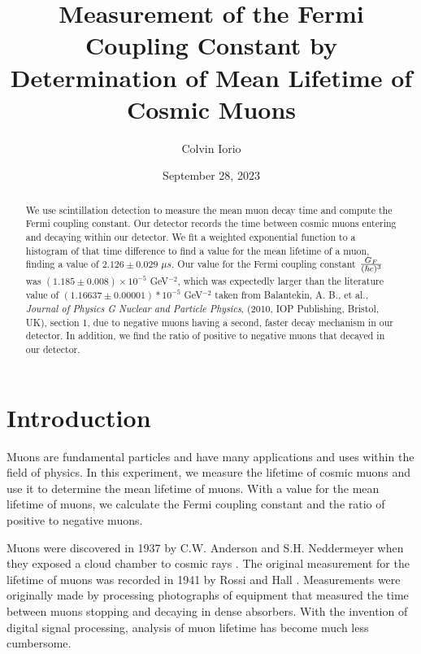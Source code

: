 \documentclass[11pt,letterpaper]{article}
\begin{document}
\title{Measurement of the Fermi Coupling Constant by Determination of Mean Lifetime of Cosmic Muons}

\author{Colvin Iorio}

\date{September 28, 2023}
\maketitle


\begin{abstract}
    We use scintillation detection to measure the mean muon decay time and compute the Fermi coupling constant. Our detector records the time between cosmic muons entering and decaying within our detector. We fit a weighted exponential function to a histogram of that time difference to find a value for the mean lifetime of a muon, finding a value of $2.126 \pm 0.029$ $\mu s$. Our value for the Fermi coupling constant ${G_F \over (\hbar c)^3}$ was $(1.185 \pm 0.008) \times 10^{-5}$ GeV$^{-2}$, which was expectedly larger than the literature value of $(1.16637 \pm 0.00001)*10^{-5}$ GeV$^{-2}$ taken from Balantekin, A. B., et al., \textit{Journal of Physics G Nuclear and Particle Physics}, (2010, IOP Publishing, Bristol, UK), section 1, due to negative muons having a second, faster decay mechanism in our detector. In addition, we find the ratio of positive to negative muons that decayed in our detector.
\end{abstract}


\section{Introduction}\label{sec intro}

Muons are fundamental particles and have many applications and uses within the field of physics. In this experiment, we measure the lifetime of cosmic muons and use it to determine the mean lifetime of muons. With a value for the mean lifetime of muons, we calculate the Fermi coupling constant and the ratio of positive to negative muons.

Muons were discovered in 1937 by C.W. Anderson and S.H. Neddermeyer when they exposed a cloud chamber to cosmic rays \cite{Coan}. The original measurement for the lifetime of muons was recorded in 1941 by Rossi and Hall \cite{Wolfs}. Measurements were originally made by processing photographs of equipment that measured the time between muons stopping and decaying in dense absorbers. With the invention of digital signal processing, analysis of muon lifetime has become much less cumbersome.
\end{document}
